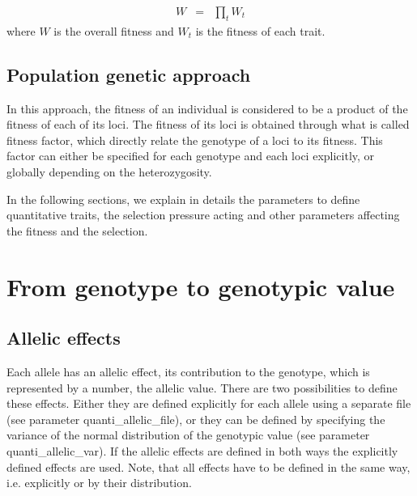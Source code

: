 \documentclass[letterpaper,12pt,oneside]{book}
\begin{document}
\begin{eqnarray}
W &=& \prod_t W_t
\end{eqnarray}
where $W$ is the overall fitness and $W_t$ is the fitness of each trait. 
\subsection{Population genetic approach}
In this approach, the fitness of an individual is considered to be a product of the fitness of each of its loci. The fitness of its loci is obtained through what is called fitness factor, which directly relate the genotype of a loci to its fitness. This factor can either be specified for each genotype and each loci explicitly, or globally depending on the heterozygosity.  

In the following sections, we explain in details the parameters to define quantitative traits, the selection pressure acting and other parameters affecting the fitness and the selection. 

\section{From genotype to genotypic value }
\subsection{Allelic effects}
Each allele has an allelic effect, its contribution to the genotype, which is represented by a number, the allelic value. There are two possibilities to define these effects. Either they are defined explicitly for each allele using a separate file (see parameter \textsf{quanti\_allelic\_file}), or they can be defined by specifying the variance of the normal distribution of the genotypic value (see parameter \textsf{quanti\_allelic\_var}). If the allelic effects are defined in both ways the explicitly defined effects are used. Note, that all effects have to be defined in the same way, i.e. explicitly or by their distribution.
\end{document}
